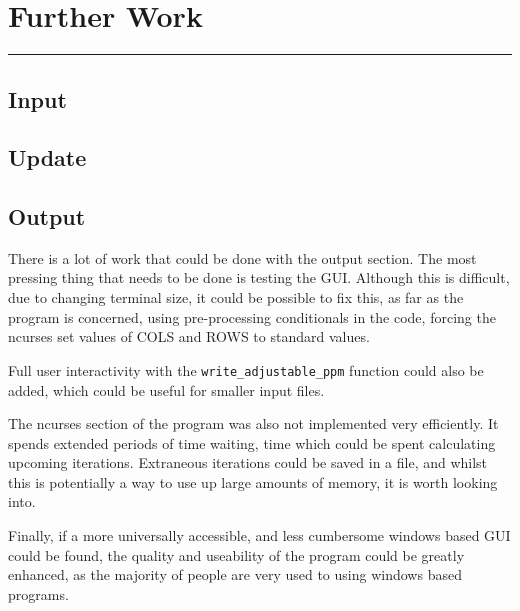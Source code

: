 \section{Further Work}
\vspace{-2em}\rule{\textwidth}{1pt}\vspace{-1em}
\subsection{Input}
\subsection{Update}
\subsection{Output}
	There is a lot of work that could be done with the output section.
	The most pressing thing that needs to be done is testing the GUI.
	Although this is difficult, due to changing terminal size, it could be possible to fix this, as far as the program is concerned, using
	pre-processing conditionals in the code, forcing the ncurses set values of COLS and ROWS to standard values.
	
	Full user interactivity with the \texttt{write\_adjustable\_ppm} function could also be added, which could be useful for smaller input files.

	The ncurses section of the program was also not implemented very efficiently.
	It spends extended periods of time waiting, time which could be spent calculating upcoming iterations.
	Extraneous iterations could be saved in a file, and whilst this is potentially a way to use up large amounts of memory, it is worth looking into.
	
	Finally, if a more universally accessible, and less cumbersome windows based GUI could be found, the quality and useability of the program could be greatly enhanced, as the majority of people are very used to using windows based programs.

